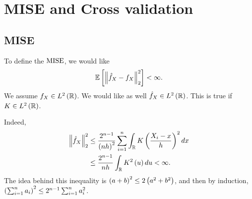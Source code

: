 \section{MISE and Cross validation}
\subsection{MISE}
To define the $\mathrm{MISE}$, we would like
\begin{equation*}
	\mathbb{E}\left[\left\| \hat{f}_X - f_X \right\|^2_2\right] < \infty.
\end{equation*}
We assume $f_X\in L^2\left(\mathbb{R}\right)$. We would like as well $\hat{f}_X\in L^2\left(\mathbb{R}\right)$. This is true if $K\in L^2\left(\mathbb{R}\right)$.

Indeed,
\begin{equation*}
	\begin{split}
		\left\| \hat{f}_X \right\|_2^2 & \leq \frac{2^{n-1}}{\left(nh\right)^2} \sum_{i=1}^n \int_{\mathbb{R}} K\left(\frac{X_i -x}{h}\right)^2 dx \\
		                     & \leq \frac{2^{n-1}}{nh} \int_{\mathbb{R}} K^2\left(u\right) du <\infty.
	\end{split}
\end{equation*}
The idea behind this inequality is $\left(a+b\right)^2 \leq 2 \left(a^2 + b^2\right)$, and then by induction, $\left(\sum_{i=1}^n a_i \right)^2 \leq 2^{n-1} \sum_{i=1}^n a_i^2$.
